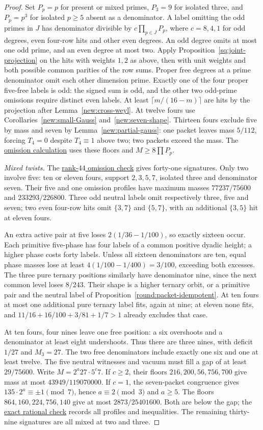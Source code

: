 \documentclass[11pt]{amsart}
\numberwithin{equation}{section}
\theoremstyle{definition}
\theoremstyle{plain}
\newcommand{\supfile}[2]{\href{run:rank-bound-supplement/#1}{#2}}
\begin{document}
\begin{proof}
Set $P_p=p$ for present or mixed primes, $P_3=9$ for isolated three,
and $P_p=p^3$ for isolated $p\ge5$ absent as a denominator.
A label omitting the odd primes in $J$ has denominator divisible
by $c\prod_{p\in J}P_p$, where $c=8,4,1$ for odd degrees, even
four-row hits and other even degrees. An odd degree omits at most
one odd prime, and an even degree at most two. Apply
Proposition~\ref{sq:joint-projection} on the hits with weights $1,2$
as above, then with unit weights and both possible common parities
of the row sums. Proper free degrees at a prime denominator omit
each other dimension prime. Exactly one of the four proper
five-free labels is odd: the signed sum is odd, and the other two
odd-prime omissions require distinct even labels. At least
$\lceil m/(16-m)\rceil$ are hits by the projection after
Lemma~\ref{new:cross-weyl}. At twelve fours use
Corollaries~\ref{new:small-Gauss} and~\ref{new:seven-shape}.
Thirteen fours exclude five by mass and seven by
Lemma~\ref{new:partial-gauss}: one packet leaves mass $5/112$,
forcing $T_4=0$ despite $T_4\equiv1$ above two; two packets exceed
the mass. The \supfile{arithmetic/large_four.py}{omission calculation}
uses these floors and $M\ge8\prod P_p$.

\emph{Mixed twists.}
The \supfile{arithmetic/high_four44.py}{rank-$44$ omission check}
gives forty-one signatures. Only two involve five: ten or eleven
fours, support $2,3,5,7$, isolated three and denominator seven.
Their five and one omission profiles have maximum masses
$77237/75600$ and $233293/226800$. Three odd neutral labels omit
respectively three, five and seven; two even four-row hits omit
$\{3,7\}$ and $\{5,7\}$, with an additional $\{3,5\}$ hit at
eleven fours.

An extra active pair at five loses $2(1/36-1/100)$, so exactly
sixteen occur. Each primitive five-phase has four labels of a common
positive dyadic height; a higher phase costs forty labels. Unless
all sixteen denominators are ten, equal phase masses lose at least
$4(1/100-1/400)=3/100$, exceeding both excesses. The three pure
ternary positions similarly have denominator nine, since the next
common level loses $8/243$. Their shape is a higher ternary orbit,
or a primitive pair and the neutral label of
Proposition~\ref{round:packet-idempotent}. At ten fours at most one
additional pure ternary label fits, again at nine; at eleven none
fits, and $11/16+16/100+3/81+1/7>1$ already excludes that case.

At ten fours, four nines leave one free position: a six overshoots
and a denominator at least eight undershoots. Thus there are three
nines, with deficit $1/27$ and $M_3=27$. The two free denominators
include exactly one six and one at least twelve. The five neutral
witnesses and vacuum must fill a gap of at least $29/75600$.
Write $M=2^a27\cdot5^c7$. If $c\ge2$, their floors
$216,200,56,756,700$ give mass at most $43949/119070000$.
If $c=1$, the seven-packet congruence gives
$135\cdot2^a\equiv\pm1\pmod7$, hence $a\equiv2\pmod3$ and $a\ge5$.
The floors $864,160,224,756,140$ give at most $2873/25401600$.
Both are below the gap; the
\supfile{arithmetic/two_five44.py}{exact rational check} records all
profiles and inequalities. The remaining thirty-nine signatures
are all mixed at two and three.


\end{proof}
\end{document}
